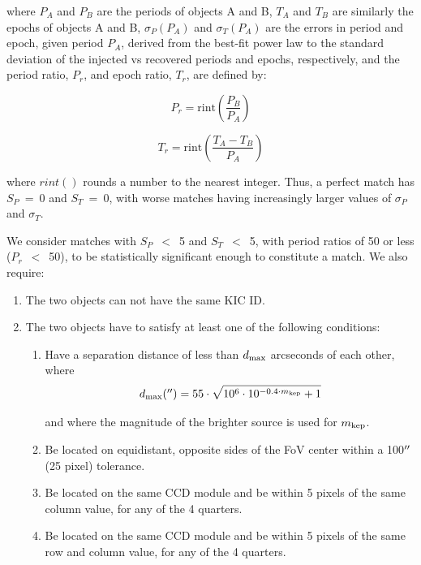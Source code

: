 \noindent where $P_{A}$ and $P_{B}$ are the periods of objects A and B, $T_{A}$ and $T_{B}$ are similarly the epochs of objects A and B, $\sigma_{P}(P_{A})$ and $\sigma_{T}(P_{A})$ are the errors in period and epoch, given period $P_{A}$, derived from the best-fit power law to the standard deviation of the injected vs recovered periods and epochs, respectively, and the period ratio, $P_{r}$, and epoch ratio, $T_{r}$, are defined by:

\begin{equation}
P_{r} = \textrm{rint}\left(\frac{P_{B}}{P_{A}}\right)
\end{equation}

\begin{equation}
T_{r} = \textrm{rint}\left(\frac{T_{A} - T_{B}}{P_{A}}\right)
\end{equation}


\noindent where $rint()$ rounds a number to the nearest integer. Thus, a perfect match has $S_{P}$~=~0 and  $S_{T}$~=~0, with worse matches having increasingly larger values of $ \sigma_{P}$ and $ \sigma_{T}$. 

We consider matches with $S_{P}$~$<$~5 and $S_{T}$~$<$~5, with period ratios of 50 or less ($P_{r}$~$<$~50), to be statistically significant enough to constitute a match. We also require:

\begin{enumerate}

\item The two objects can not have the same KIC ID.

\item The two objects have to satisfy at least one of the following conditions: 

    \begin{enumerate}
    
    \item Have a separation distance of less than $d_{\rm max}$ arcseconds of each other, where
    \begin{equation}
    \label{disteq}
    d_{\rm max}(\arcsec) = 55\cdot\sqrt{10^{6}\cdot 10^{-0.4 \cdot m_{\rm kep}}+1}
    \end{equation}

\noindent and where the magnitude of the brighter source is used for $m_{\rm kep}$.  

    \item Be located on equidistant, opposite sides of the FoV center within a 100$\mbox{$^{\prime\prime}$}$ (25 pixel) tolerance.
    
    \item Be located on the same CCD module and be within 5 pixels of the same column value, for any of the 4 quarters.
    
    \item Be located on the same CCD module and be within 5 pixels of the same row and column value, for any of the 4 quarters.

   \end{enumerate}

\end{enumerate}


